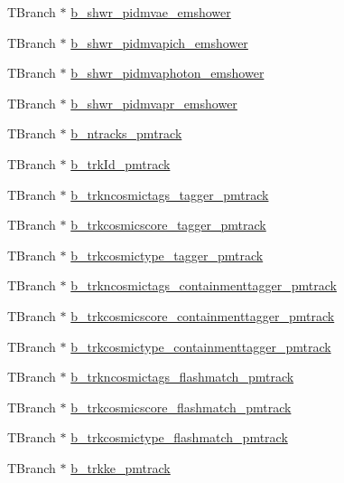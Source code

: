 \begin{DoxyCompactItemize}
T\-Branch $\ast$ \hyperlink{classanatree_a33729e5a8055bd33e5c40fb5cd312891}{b\-\_\-shwr\-\_\-pidmvae\-\_\-emshower}
\item 
T\-Branch $\ast$ \hyperlink{classanatree_a68907c0bbc14bd07e613a36f052ed895}{b\-\_\-shwr\-\_\-pidmvapich\-\_\-emshower}
\item 
T\-Branch $\ast$ \hyperlink{classanatree_acddee7dc77af04ebd4f7340a6c623cd8}{b\-\_\-shwr\-\_\-pidmvaphoton\-\_\-emshower}
\item 
T\-Branch $\ast$ \hyperlink{classanatree_a1c312b7528dd965e60e966958df44a75}{b\-\_\-shwr\-\_\-pidmvapr\-\_\-emshower}
\item 
T\-Branch $\ast$ \hyperlink{classanatree_ac4bc45c259ca755ad90c0a5ea5c99ef2}{b\-\_\-ntracks\-\_\-pmtrack}
\item 
T\-Branch $\ast$ \hyperlink{classanatree_ae4581986c9bf7a70e5f6f60daed8c13b}{b\-\_\-trk\-Id\-\_\-pmtrack}
\item 
T\-Branch $\ast$ \hyperlink{classanatree_a5a5992e116d6ddedab039dc81bdaa81a}{b\-\_\-trkncosmictags\-\_\-tagger\-\_\-pmtrack}
\item 
T\-Branch $\ast$ \hyperlink{classanatree_acea80ce051ac4c151ff166324d320ea6}{b\-\_\-trkcosmicscore\-\_\-tagger\-\_\-pmtrack}
\item 
T\-Branch $\ast$ \hyperlink{classanatree_a8298ed44e725fbdeca0285e241ff0b8b}{b\-\_\-trkcosmictype\-\_\-tagger\-\_\-pmtrack}
\item 
T\-Branch $\ast$ \hyperlink{classanatree_a9a433cf0b8b60c1b203eeb85943ec883}{b\-\_\-trkncosmictags\-\_\-containmenttagger\-\_\-pmtrack}
\item 
T\-Branch $\ast$ \hyperlink{classanatree_a9f95ac753ddc4695f5bd2744ca1f101a}{b\-\_\-trkcosmicscore\-\_\-containmenttagger\-\_\-pmtrack}
\item 
T\-Branch $\ast$ \hyperlink{classanatree_a379540dbdb76f41552ff598f7084417d}{b\-\_\-trkcosmictype\-\_\-containmenttagger\-\_\-pmtrack}
\item 
T\-Branch $\ast$ \hyperlink{classanatree_a32a1356cca07e211dd87055dff9509e7}{b\-\_\-trkncosmictags\-\_\-flashmatch\-\_\-pmtrack}
\item 
T\-Branch $\ast$ \hyperlink{classanatree_a31f69bca282d80ba19e9e2e8969c195c}{b\-\_\-trkcosmicscore\-\_\-flashmatch\-\_\-pmtrack}
\item 
T\-Branch $\ast$ \hyperlink{classanatree_a2141229491160d7b5787b70b311b97c0}{b\-\_\-trkcosmictype\-\_\-flashmatch\-\_\-pmtrack}
\item 
T\-Branch $\ast$ \hyperlink{classanatree_a70970a51d3ea728b0feec5c368687477}{b\-\_\-trkke\-\_\-pmtrack}

\end{DoxyCompactItemize}
